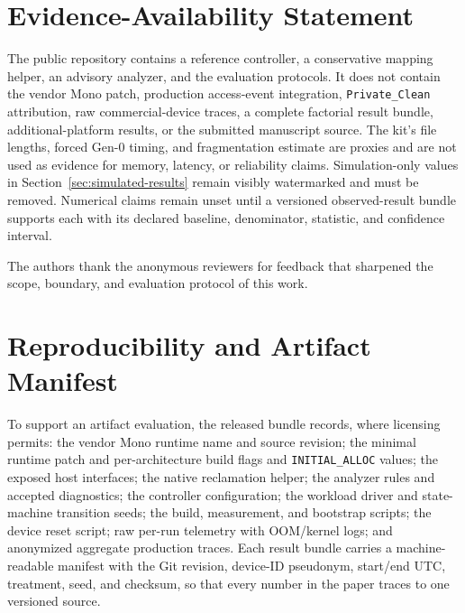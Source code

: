 \documentclass[acmsmall,screen]{acmart}
\begin{document}
\section*{Evidence-Availability Statement}
The public repository contains a reference controller, a conservative
mapping helper, an advisory analyzer, and the evaluation protocols. It does
not contain the vendor Mono patch, production access-event integration,
\texttt{Private\_Clean} attribution, raw commercial-device traces, a
complete factorial result bundle, additional-platform results, or the
submitted manuscript source. The kit's file lengths, forced Gen-0 timing,
and fragmentation estimate are proxies and are not used as evidence for
memory, latency, or reliability claims. Simulation-only values in Section~\ref{sec:simulated-results} remain visibly
watermarked and must be removed. Numerical claims remain unset until a
versioned observed-result bundle
supports each with its declared baseline, denominator, statistic, and
confidence interval.

\begin{acks}
The authors thank the anonymous reviewers for feedback that sharpened the
scope, boundary, and evaluation protocol of this work.
\end{acks}




\appendix

\section{Reproducibility and Artifact Manifest}
\label{app:artifact}

To support an artifact evaluation, the released bundle records, where
licensing permits: the vendor Mono runtime name and source revision; the
minimal runtime patch and per-architecture build flags and
\texttt{INITIAL\_ALLOC} values; the exposed host interfaces; the native
reclamation helper; the analyzer rules and accepted diagnostics; the
controller configuration; the workload driver and state-machine transition
seeds; the build, measurement, and bootstrap scripts; the device reset
script; raw per-run telemetry with OOM/kernel logs; and anonymized aggregate
production traces. Each result bundle carries a machine-readable manifest with
the Git revision, device-ID pseudonym, start/end UTC, treatment, seed, and
checksum, so that every number in the paper traces to one versioned source.
\end{document}
